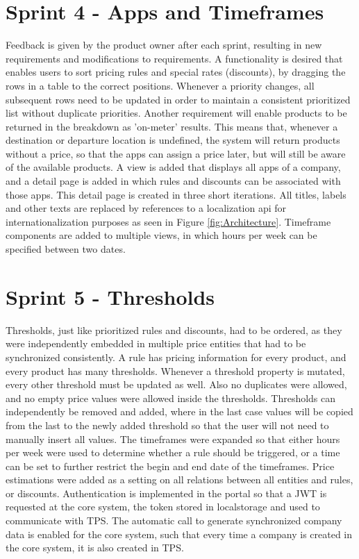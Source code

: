 %
\section{Sprint 4 - Apps and Timeframes}
Feedback is given by the product owner after each sprint, resulting in new requirements and modifications to requirements. A functionality is desired that enables users to sort pricing rules and special rates (discounts), by dragging the rows in a table to the correct positions. Whenever a priority changes, all subsequent rows need to be updated in order to maintain a consistent prioritized list without duplicate priorities. Another requirement will enable products to be returned in the breakdown as 'on-meter' results. This means that, whenever a destination or departure location is undefined, the system will return products without a price, so that the apps can assign a price later, but will still be aware of the available products. A view is added that displays all apps of a company, and a detail page is added in which rules and discounts can be associated with those apps. This detail page is created in three short iterations. All titles, labels and other texts are replaced by references to a localization api for internationalization purposes as seen in Figure \ref{fig:Architecture}. Timeframe components are added to multiple views, in which hours per week can be specified between two dates.

%
\section{Sprint 5 - Thresholds}
Thresholds, just like prioritized rules and discounts, had to be ordered, as they were independently embedded in multiple price entities that had to be synchronized consistently. A rule has pricing information for every product, and every product has many thresholds. Whenever a threshold property is mutated, every other threshold must be updated as well. Also no duplicates were allowed, and no empty price values were allowed inside the thresholds. Thresholds can independently be removed and added, where in the last case values will be copied from the last to the newly added threshold so that the user will not need to manually insert all values. The timeframes were expanded so that either hours per week were used to determine whether a rule should be triggered, or a time can be set to further restrict the begin and end date of the timeframes. Price estimations were added as a setting on all relations between all entities and rules, or discounts. Authentication is implemented in the portal so that a JWT is requested at the core system, the token stored in localstorage and used to communicate with TPS. The automatic call to generate synchronized company data is enabled for the core system, such that every time a company is created in the core system, it is also created in TPS.

